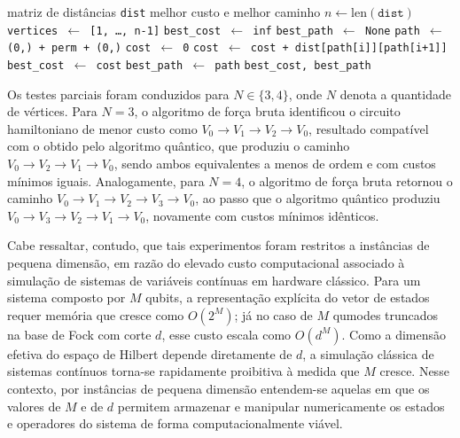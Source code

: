     
    \begin{algorithm}
        \caption{Algoritmo de Força Bruta}
        \label{alg:brute_force}
        \begin{algorithmic}[1]
        \Require matriz de distâncias \texttt{dist}
        \Ensure melhor custo e melhor caminho
        \State $n \gets \text{len}(\texttt{dist})$
        \State \texttt{vertices $\gets$ [1, \dots, n-1]}
        \State \texttt{best\_cost $\gets$ inf}
        \State \texttt{best\_path $\gets$ None}
            \State \texttt{path $\gets$ (0,) + perm + (0,)}
            \State \texttt{cost $\gets$ 0}
                \State \texttt{cost $\gets$ cost + dist[path[i]][path[i+1]]}
            \EndFor
                \State \texttt{best\_cost $\gets$ cost}
                \State \texttt{best\_path $\gets$ path}
            \EndIf
        \EndFor
        \State \Return \texttt{best\_cost, best\_path}
        \end{algorithmic}
    \end{algorithm}

    Os testes parciais foram conduzidos para $N \in \{3, 4\}$, onde $N$ denota a quantidade de vértices. Para $N = 3$, o algoritmo de força bruta identificou o circuito hamiltoniano de menor custo como $V_0 \rightarrow V_1 \rightarrow V_2 \rightarrow V_0$, resultado compatível com o obtido pelo algoritmo quântico, que produziu o caminho $V_0 \rightarrow V_2 \rightarrow V_1 \rightarrow V_0$, sendo ambos equivalentes a menos de ordem e com custos mínimos iguais. Analogamente, para $N = 4$, o algoritmo de força bruta retornou o caminho $V_0 \rightarrow V_1 \rightarrow V_2 \rightarrow V_3 \rightarrow V_0$, ao passo que o algoritmo quântico produziu $V_0 \rightarrow V_3 \rightarrow V_2 \rightarrow V_1 \rightarrow V_0$, novamente com custos mínimos idênticos. 

    Cabe ressaltar, contudo, que tais experimentos foram restritos a instâncias de pequena dimensão, em razão do elevado custo computacional associado à simulação de sistemas de variáveis contínuas em hardware clássico. Para um sistema composto por $M$ qubits, a representação explícita do vetor de estados requer memória que cresce como $O(2^M)$; já no caso de $M$ qumodes truncados na base de Fock com corte $d$, esse custo escala como $O(d^M)$. Como a dimensão efetiva do espaço de Hilbert depende diretamente de $d$, a simulação clássica de sistemas contínuos torna-se rapidamente proibitiva à medida que $M$ cresce. Nesse contexto, por instâncias de pequena dimensão entendem-se aquelas em que os valores de $M$ e de $d$ permitem armazenar e manipular numericamente os estados e operadores do sistema de forma computacionalmente viável.

